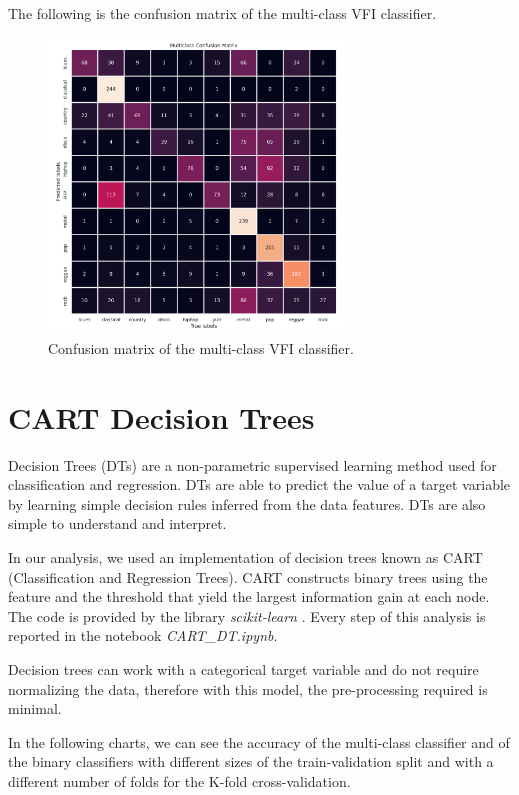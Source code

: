 \documentclass{Configuration_Files/PoliMi3i_thesis}
\begin{document}
The following is the confusion matrix of the multi-class VFI classifier.

\begin{figure}[H]
    \centering
    \includegraphics[width=0.7\textwidth]{Figures/vfi_m.png}
    \caption{Confusion matrix of the multi-class VFI classifier.}
    \label{fig:vfim}
\end{figure}

\pagebreak


\section{CART Decision Trees}
\label{sec:dtree}%
Decision Trees (DTs) are a non-parametric supervised learning method used for classification and regression. DTs are able to predict the value of a target variable by learning simple decision rules inferred from the data features. DTs are also simple to understand and interpret.

In our analysis, we used an implementation of decision trees known as CART (Classification and Regression Trees). CART constructs binary trees using the feature and the threshold that yield the largest information gain at each node. The code is provided by the library \textit{scikit-learn} \cite{scikit-learn}. 
Every step of this analysis is reported in the notebook \textit{CART\_DT.ipynb}.

Decision trees can work with a categorical target variable and do not require normalizing the data, therefore with this model, the pre-processing required is minimal.  

In the following charts, we can see the accuracy of the multi-class classifier and of the binary classifiers with different sizes of the train-validation split and with a different number of folds for the K-fold cross-validation.
\end{document}
